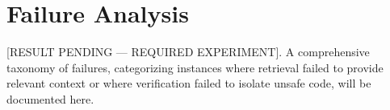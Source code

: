 \section{Failure Analysis}
[RESULT PENDING --- REQUIRED EXPERIMENT].
A comprehensive taxonomy of failures, categorizing instances where retrieval failed to provide relevant context or where verification failed to isolate unsafe code, will be documented here.
